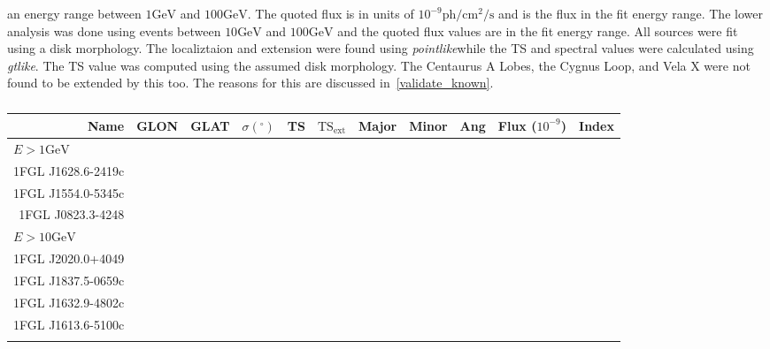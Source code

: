 \documentclass[preprint]{aastex}
\newcommand{\gev}{\text{GeV}}
\newcommand{\pointlike}{{\em pointlike}}
\newcommand{\gtlike}{{\em gtlike}}
\begin{document}
\begin{table}
\begin{centering}
{      an energy range between $1\gev$ and $100\gev$.
      The quoted flux is in units of $10^{-9}\text{ph}/\text{cm}^2/\text{s}$ and 
      is the flux in the fit energy range.
      The lower analysis was done using events between
      $10\gev$ and $100\gev$ and the quoted flux
      values are in the fit energy range. All sources were
      fit using a disk morphology. The localiztaion and extension
      were found using \pointlike while the TS and spectral
      values were calculated using \gtlike.
      The TS value was computed using 
      the assumed disk morphology. The Centaurus A Lobes,
      the Cygnus Loop, and Vela X were not found to be extended by
      this too. The reasons for this are discussed in~\ref{validate_known}.
      }
    \end{centering}
\end{table}


\clearpage

\begin{table}
    \begin{centering}
      \begin{tabular}{rrrrrrrrrrr}
        Name           &    GLON &    GLAT & $\sigma(^\circ)$ &      TS & $\text{TS}_\text{ext}$ & Major & Minor & Ang & Flux ($10^{-9}$) & Index \\
        \hline
        \multicolumn{11}{l}{$E > 1\gev$} \\
        \hline
        1FGL J1628.6-2419c \\
        1FGL J1554.0-5345c \\
        1FGL J0823.3-4248 \\
        \hline
        \multicolumn{11}{l}{$E > 10\gev$} \\
        \hline
        1FGL J2020.0+4049 \\
        1FGL J1837.5-0659c \\
        1FGL J1632.9-4802c \\
        1FGL J1613.6-5100c \\
        \hline
      \label{new_ext_srcs}
      \end{tabular}
      \caption{}
    \end{centering}
\end{table}
\end{document}
